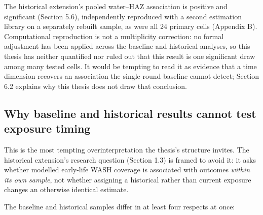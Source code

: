 The historical extension's pooled water--HAZ association is positive and significant (Section 5.6), independently reproduced with a second estimation library on a separately rebuilt sample, as were all 24 primary cells (Appendix B). Computational reproduction is not a multiplicity correction: no formal adjustment has been applied across the baseline and historical analyses, so this thesis has neither quantified nor ruled out that this result is one significant draw among many tested cells. It would be tempting to read it as evidence that a time dimension recovers an association the single-round baseline cannot detect; Section 6.2 explains why this thesis does not draw that conclusion.

\subsection{Why baseline and historical results cannot test exposure timing}\label{sec:6.2}

This is the most tempting overinterpretation the thesis's structure invites. The historical extension's research question (Section 1.3) is framed to avoid it: it asks whether modelled early-life WASH coverage is associated with outcomes \emph{within its own sample}, not whether assigning a historical rather than current exposure changes an otherwise identical estimate.

The baseline and historical samples differ in at least four respects at once:

